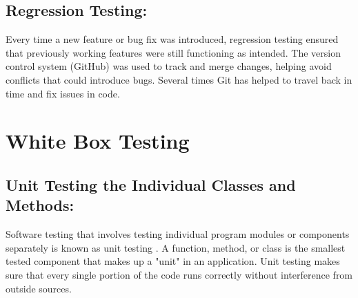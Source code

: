 	\subsection{Regression Testing:}
	Every time a new feature or bug fix was introduced, regression testing ensured that previously working features were still functioning as intended.
	The version control system (GitHub) was used to track and merge changes, helping avoid conflicts that could introduce bugs. Several times Git has helped to travel back in time and fix issues in code.
\section{White Box Testing}
\subsection{Unit Testing the Individual Classes and Methods:} 
Software testing that involves testing individual program modules or components separately is known as unit testing \cite{fowler_unit_test}. A function, method, or class is the smallest tested component that makes up a "unit" in an application. Unit testing makes sure that every single portion of the code runs correctly without interference from outside sources.
